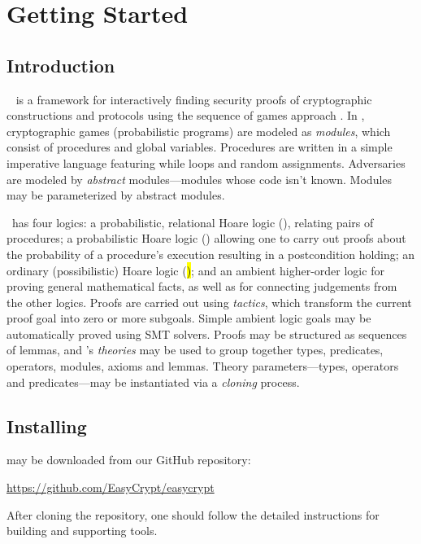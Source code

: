 \chapter{Getting Started}

\section{Introduction}

\EasyCrypt\ \cite{barthe-easycrypt-intro-2014,barthe-crypto-2011} is a
framework for interactively finding security proofs of cryptographic
constructions and protocols using the sequence of games approach
\cite{bellare-rogaway-code-based-2004,%
  bellare-rogaway-triple-enc-2006,shoup-seq-games-2004}.  In
\EasyCrypt, cryptographic games (probabilistic programs) are modeled
as \emph{modules}, which consist of procedures and global variables.
Procedures are written in a simple imperative language featuring while
loops and random assignments. Adversaries are modeled by \emph{abstract}
modules---modules whose code isn't known. Modules may be parameterized
by abstract modules.

\EasyCrypt\ has four logics: a probabilistic, relational Hoare logic
(\prhl), relating pairs of procedures; a probabilistic Hoare logic
(\phl) allowing one to carry out proofs about the probability of a
procedure's execution resulting in a postcondition holding; an
ordinary (possibilistic) Hoare logic (\hl); and an ambient
higher-order logic for proving general mathematical facts, as well as
for connecting judgements from the other logics.  Proofs are carried
out using \emph{tactics}, which transform the current proof goal into
zero or more subgoals. Simple ambient logic goals may be automatically
proved using SMT solvers. Proofs may be structured as sequences of
lemmas, and \EasyCrypt's \emph{theories} may be used to group together
types, predicates, operators, modules, axioms and lemmas. Theory
parameters---types, operators and predicates---may be instantiated via
a \emph{cloning} process.

\section{Installing \EasyCrypt}

\EasyCrypt may be downloaded from our GitHub repository:
\begin{center}
  \url{https://github.com/EasyCrypt/easycrypt}
\end{center}
After cloning the repository, one should follow the detailed
instructions for building \EasyCrypt and supporting tools.

